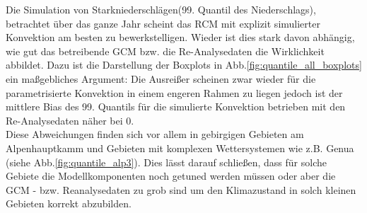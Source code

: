 Die Simulation von Starkniederschlägen(99. Quantil des Niederschlags), betrachtet über das ganze Jahr scheint das RCM mit explizit simulierter Konvektion am besten zu bewerkstelligen. Wieder ist dies stark davon abhängig, wie gut das betreibende GCM bzw. die Re-Analysedaten die Wirklichkeit abbildet. Dazu ist die Darstellung der Boxplots in Abb.\ref{fig:quantile_all_boxplots} ein maßgebliches Argument: Die Ausreißer scheinen zwar wieder für die parametrisierte Konvektion in einem engeren Rahmen zu liegen jedoch ist der mittlere Bias des 99. Quantils für die simulierte Konvektion betrieben mit den Re-Analysedaten näher bei 0.\\
Diese Abweichungen finden sich vor allem in gebirgigen Gebieten am Alpenhauptkamm und  Gebieten mit komplexen Wettersystemen wie z.B. Genua (siehe Abb.\ref{fig:quantile_alp3}). Dies lässt darauf schließen, dass für solche Gebiete die Modellkomponenten noch getuned werden müssen oder aber die GCM - bzw. Reanalysedaten zu grob sind um den Klimazustand in solch kleinen Gebieten korrekt abzubilden.\vspace{1pt}\\

